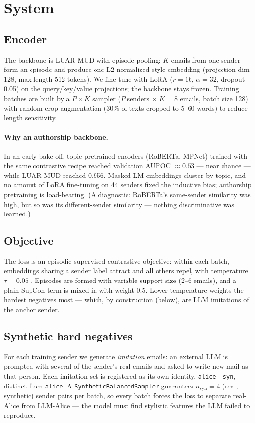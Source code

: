 \documentclass[11pt]{article}
\begin{document}
\section{System}
\label{sec:system}

\subsection{Encoder}
The backbone is LUAR-MUD \citep{riverasoto2021} with episode pooling: $K$ emails from one sender
form an episode and produce one L2-normalized style embedding (projection dim 128, max length 512
tokens). We fine-tune with LoRA \citep{hu2022} ($r{=}16$, $\alpha{=}32$, dropout 0.05) on the
query/key/value projections; the backbone stays frozen. Training batches are built by a $P{\times}K$
sampler ($P$ senders $\times$ $K{=}8$ emails, batch size 128) with random crop augmentation
(30\% of texts cropped to 5--60 words) to reduce length sensitivity.

\paragraph{Why an authorship backbone.} In an early bake-off, topic-pretrained encoders
(RoBERTa, MPNet) trained with the same contrastive recipe reached validation AUROC ${\approx}0.53$
--- near chance --- while LUAR-MUD reached 0.956. Masked-LM embeddings cluster by topic, and no
amount of LoRA fine-tuning on 44 senders fixed the inductive bias; authorship pretraining is
load-bearing. (A diagnostic: RoBERTa's same-sender similarity was high, but so was its
different-sender similarity --- nothing discriminative was learned.)

\subsection{Objective}
The loss is an episodic supervised-contrastive objective: within each batch, embeddings sharing a
sender label attract and all others repel, with temperature $\tau{=}0.05$
\citep{khosla2020}. Episodes are formed with variable support size (2--6 emails), and a plain
SupCon term is mixed in with weight 0.5. Lower temperature weights the hardest negatives most ---
which, by construction (below), are LLM imitations of the anchor sender.

\subsection{Synthetic hard negatives}
\label{sec:synthetics}
For each training sender we generate \emph{imitation} emails: an external LLM is prompted with
several of the sender's real emails and asked to write new mail as that person. Each imitation set
is registered as its own identity, \texttt{alice\_\_syn}, distinct from \texttt{alice}. A
\texttt{SyntheticBalancedSampler} guarantees $n_{\mathrm{syn}}{=}4$ (real, synthetic) sender pairs
per batch, so every batch forces the loss to separate real-Alice from LLM-Alice --- the model must
find stylistic features the LLM failed to reproduce.
\end{document}
